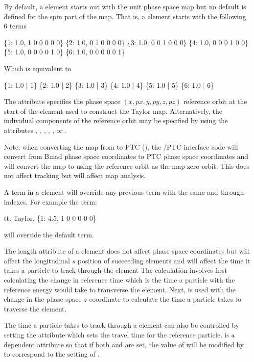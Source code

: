{By default, a  element starts out with the unit phase space map but no default
is defined for the spin part of the map.  That is, a  element starts with the
following 6 terms
\begin{example}
  \{1: 1.0, 1 0 0 0 0 0\}
  \{2: 1.0, 0 1 0 0 0 0\}
  \{3: 1.0, 0 0 1 0 0 0\}
  \{4: 1.0, 0 0 0 1 0 0\}
  \{5: 1.0, 0 0 0 0 1 0\}
  \{6: 1.0, 0 0 0 0 0 1\}
\end{example}
Which is equivalent to
\begin{example}
  \{1: 1.0 | 1\}
  \{2: 1.0 | 2\}
  \{3: 1.0 | 3\}
  \{4: 1.0 | 4\}
  \{5: 1.0 | 5\}
  \{6: 1.0 | 6\}
\end{example}

The  attribute specifies the phase space $(x, px, y, py, z, pz)$ reference
orbit at the start of the element used to construct the Taylor map. Alternatively, the
individual components of the reference orbit may be specified by using the attributes 
, , , , , or .

Note: when converting the map from \bmad to PTC (), the \bmad/PTC interface
code will convert from Bmad phase space coordinates to PTC phase space coordinates and
will convert the map to using the reference orbit as the map zero orbit. This does not
affect tracking but will affect map analysis.

A term in a  element will override any previous term
with the same  and  through  indexes. For example the term:
\begin{example}
  tt: Taylor, \{1: 4.5, 1 0 0 0 0 0\} 
\end{example}
will override the default  term.

The  length attribute of a  element does not affect phase space coordinates but
will affect the longitudinal $s$ position of succeeding elements and will affect the time it takes a
particle to track through the element The calculation involves first calculating the change in
reference time which is the time a particle with the reference energy would take to transverse the
element. Next,  is used with the change in the phase space $z$ coordinate to calculate
the time a particle takes to traverse the element.

The time a particle takes to track through a  element can also be controlled by setting
the  attribute which sets the travel time for the reference
particle.  is a dependent attribute so that if both  and
 are set, the value of  will be modified by \bmad to
correspond to the setting of .

}
